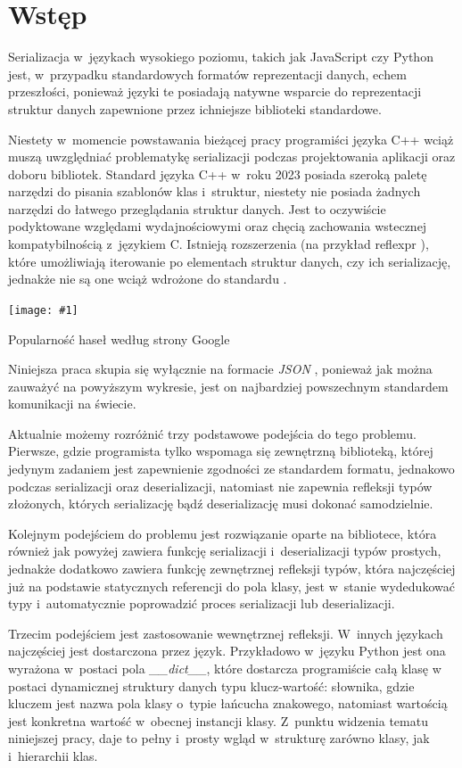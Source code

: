 \documentclass[12pt]{article}
\newcommand{\n}{\newline}
\newcommand{\putfig}[3]{
\begin{captioned}[H]
	\centering
	\texttt{[image: \#1]}
	\caption{#2}
	\label{#3}
	\medskip
\end{captioned}
}
\newcommand{\nonpl}[1]{{\it #1}}
\newcommand{\code}[1]{{\it #1}}
\newcommand{\JSON}{\nonpl{JSON} }
\begin{document}
	{
		\section{Wstęp}

		Serializacja w~językach wysokiego poziomu, takich jak JavaScript czy Python jest, w~przypadku standardowych formatów
		reprezentacji danych, echem przeszłości, ponieważ języki te posiadają natywne wsparcie do reprezentacji struktur danych
		zapewnione przez ichniejsze biblioteki standardowe.\n

		Niestety w~momencie powstawania bieżącej pracy programiści języka C++ wciąż muszą uwzględniać problematykę
		serializacji podczas projektowania aplikacji oraz doboru bibliotek. Standard języka C++ w~roku 2023 posiada szeroką
		paletę narzędzi do pisania szablonów klas i~struktur, niestety nie posiada żadnych narzędzi do łatwego przeglądania
		struktur danych. Jest to oczywiście podyktowane względami wydajnościowymi oraz chęcią zachowania wstecznej
		kompatybilnością z~językiem C. Istnieją rozszerzenia (na przykład reflexpr \cite*{cpp_extension_reflexpr_iso}), które
		umożliwiają iterowanie po elementach struktur danych, czy ich serializację, jednakże nie są one wciąż wdrożone do
		standardu \cite*{cpp_extension_reflexpr_short}.\n

		\putfig{./charts/output_with_charts_as_images/json_vs_other_formats.png}{ Popularność haseł według strony Google \cite*{google_trends_json_api_vs_rest_of_the_world}}{json_vs_world}

		Niniejsza praca skupia się wyłącznie na formacie \JSON\cite*{json_iso}, ponieważ jak można zauważyć na powyższym wykresie, jest on
		najbardziej powszechnym standardem komunikacji na świecie.\n

		Aktualnie możemy rozróżnić trzy podstawowe podejścia do tego problemu. Pierwsze, gdzie programista tylko wspomaga się
		zewnętrzną biblioteką, której jedynym zadaniem jest zapewnienie zgodności ze standardem formatu, jednakowo podczas serializacji
		oraz deserializacji, natomiast nie zapewnia refleksji typów złożonych, których serializację bądź deserializację musi
		dokonać samodzielnie.\n

		Kolejnym podejściem do problemu jest rozwiązanie oparte na bibliotece, która również jak powyżej zawiera funkcję
		serializacji i~deserializacji typów prostych, jednakże dodatkowo zawiera funkcję zewnętrznej refleksji typów,
		która najczęściej już na podstawie statycznych referencji do pola klasy, jest w~stanie wydedukować typy i~automatycznie
		poprowadzić proces serializacji lub deserializacji.\n

		Trzecim podejściem jest zastosowanie wewnętrznej refleksji. W~innych językach najczęściej jest dostarczona przez język.
		Przykładowo w~języku Python jest ona wyrażona w~postaci pola \code{\_\_dict\_\_}, które dostarcza programiście całą klasę
		w postaci dynamicznej struktury danych typu klucz-wartość: słownika, gdzie kluczem jest nazwa pola klasy o~typie
		łańcucha znakowego, natomiast wartością jest konkretna wartość w~obecnej instancji klasy. Z~punktu widzenia tematu
		niniejszej pracy, daje to pełny i~prosty wgląd w~strukturę zarówno klasy, jak i~hierarchii klas.
	}
\end{document}
